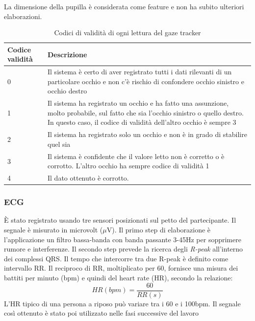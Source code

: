 La dimensione della pupilla è considerata come feature e non ha subito ulteriori elaborazioni.

\begin{table}[]
\begin{tabular}{p{}|p{}}
\toprule
Codice validità   & Descrizione \\
\midrule
0            & Il sistema è certo di aver registrato tutti i dati rilevanti di un particolare occhio
               e non c'è rischio di confondere occhio sinistro e occhio destro \\

1            & Il sistema ha registrato un occhio e ha fatto una assunzione,
               molto probabile, sul fatto che sia l'occhio sinistro o quello destro.
               In questo caso, il codice di validità dell'altro occhio è sempre 3 \\

2            & Il sistema ha registrato solo un occhio e non è in grado di stabilire quel sia \\

3            & Il sistema è confidente che il valore letto non è corretto o è corrotto.
               L'altro occhio ha sempre codice di validità 1 \\

4            & Il dato ottenuto è corrotto.  \\
\bottomrule
\end{tabular}
\caption{Codici di validità di ogni lettura del gaze tracker}
\label{tab:gaze_validity_values}
\end{table}

\subsubsection{ECG}
\uppercase{è} stato registrato usando tre sensori posizionati sul petto del partecipante. Il segnale è misurato in microvolt ($\mu$V).
Il primo step di elaborazione è l'applicazione un filtro bassa-banda con banda passante 3-45Hz per sopprimere rumore e interferenze.
Il secondo step prevede la ricerca degli \emph{R-peak} all'interno dei complessi QRS. Il tempo che intercorre tra due R-peak è definito come intervallo RR. Il reciproco di RR, moltiplicato per 60, fornisce una misura dei battiti per minuto (bpm) e quindi del heart rate (HR), secondo la relazione:
\begin{equation}
    HR(bpm) = \frac{60}{RR(s)}
\end{equation}
L'HR tipico di una persona a riposo può variare tra i 60 e i 100bpm.
Il segnale così ottenuto è stato poi utilizzato nelle fasi successive del lavoro

